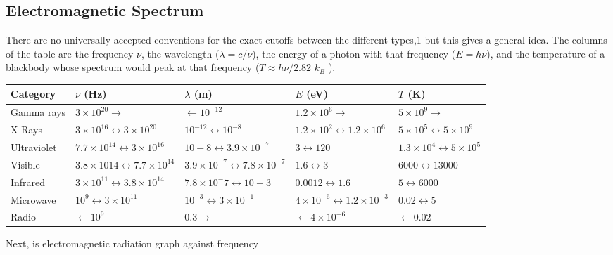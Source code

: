 \documentclass[../../main.tex]{subfiles}
\begin{document}
\subsection{Electromagnetic Spectrum}
There are no universally accepted conventions for the exact cutoffs between the different types,1 but this gives a general idea. The columns of the table are the frequency $\nu$, the wavelength ($\lambda = c/\nu$), the energy of a photon with that frequency ($E = h \nu$), and the temperature of a blackbody whose spectrum would peak at that frequency ($T \approx h \nu /2.82$ $k_B$ ).
\begin{center}
    \begin{longtable}{| p{} | p{} | p{} | p{} | p{} |}
        \hline
        Category&$\nu$ (Hz)&$\lambda$ (m)&$E$ (eV)&$T$ (K)\\
        \hline\hline
        Gamma rays&$3 \times 10^{20} \rightarrow $&$\leftarrow 10^{-12}$&$1.2 \times 10^6 \rightarrow $&$5 \times 10^9\rightarrow$ \\\hline
        X-Rays&$3 \times 10^{16} \leftrightarrow 3 \times 10^{20}$&$10^{-12} \leftrightarrow 10^{-8}$&$1.2 \times 10^2 \leftrightarrow 1.2 \times 10^6$&$5 \times 10^5 \leftrightarrow 5 \times 10^9$\\\hline
        Ultraviolet&$7.7 \times 10^{14} \leftrightarrow 3 \times 10^{16}$&$10-8 \leftrightarrow 3.9 \times 10^{-7}$&$3 \leftrightarrow 120$&$1.3 \times 10^4 \leftrightarrow 5 \times 10^5$\\\hline
        Visible&$3.8 \times 10 14 \leftrightarrow 7.7 \times 10^{14}$&$3.9 \times 10^{-7} \leftrightarrow 7.8 \times 10^{-7}$&$1.6 \leftrightarrow 3$&$6000 \leftrightarrow 13000$\\\hline
        Infrared&$3 \times 10^{11} \leftrightarrow 3.8 \times 10 ^{14}$&$7.8 \times 10^{-}7 \leftrightarrow 10-3$&$0.0012 \leftrightarrow 1.6$&$5 \leftrightarrow 6000$\\\hline
        Microwave&$10^9 \leftrightarrow 3 \times 10^{11}$&$10^{-3} \leftrightarrow 3 \times 10^{-1}$&$4 \times 10^{-6} \leftrightarrow 1.2 \times 10^{-3}$&$0.02 \leftrightarrow 5$\\\hline
        Radio&$\leftarrow 10^9$&$0.3 \rightarrow$&$\leftarrow 4 \times 10^{-6}$&$\leftarrow 0.02$\\\hline
    \end{longtable}
\end{center}

Next, is electromagnetic radiation graph against frequency
\begin{figure}[h]
    \centering
\end{figure}
\end{document}
